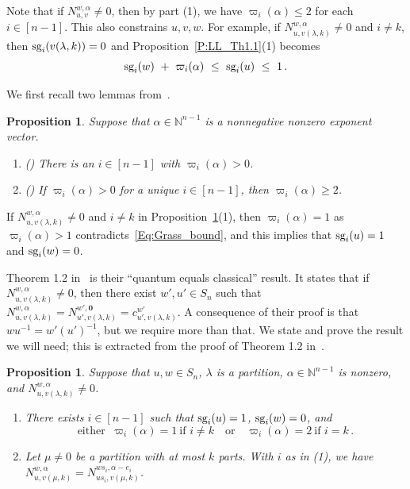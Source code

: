 \documentclass[11pt]{article}
\newtheorem{proposition}[theo]{Proposition}
\theoremstyle{definition}
\numberwithin{equation}{section}
\newcommand{\NN}{{\mathbb N}}
\newcommand{\bzero}{{\mathbf 0}}
\newcommand{\sg}{{\mbox{\rm sg}}}
\begin{document}
Note that if $N^{w,\alpha}_{u,v}\neq 0$, then by part (1), we have $\varpi_i(\alpha)\leq 2$ for each $i\in[n{-}1]$.
This also constrains $u,v,w$.
For example, if $N^{w,\alpha}_{u,v(\lambda,k)}\neq 0$ and $i\neq k$,  then $\sg_i(v(\lambda,k))=0$ and
Proposition~\ref{P:LL_Th1.1}(1) becomes 
\begin{equation}\label{Eq:Grass_bound}
  \sg_i(w)\ +\ \varpi_i(\alpha)\ \leq\ \sg_i(u)\ \leq\ 1\,.
\end{equation}

We first recall two lemmas from~\cite{LeungLi2012}.

\begin{proposition}\label{P:LL_lemmas}
   Suppose that $\alpha\in\NN^{n-1}$ is a nonnegative nonzero  exponent vector.
   \begin{enumerate}
   \item  \emph{(\cite[Lemma 2.8]{LeungLi2012})}
        There is an $i\in[n{-}1]$ with $\varpi_i(\alpha)>0$.
    \item  \emph{(\cite[Lemma 2.10]{LeungLi2012})}
        If $\varpi_i(\alpha)>0$ for a unique $i\in[n{-}1]$, then $\varpi_i(\alpha)\geq 2$.
   \end{enumerate}
\end{proposition}

If $N^{w,\alpha}_{u,v(\lambda,k)}\neq 0$ and $i\neq k$ in Proposition~\ref{P:LL_lemmas}(1), then $\varpi_i(\alpha)=1$ as
$\varpi_i(\alpha)>1$ 
contradicts~\eqref{Eq:Grass_bound}, and this implies that  $\sg_i(u)=1$ and $\sg_i(w)=0$.


Theorem 1.2 in~\cite{LeungLi2012} is their ``quantum equals classical'' result.
It states that if $N^{w, \alpha}_{u,v(\lambda,k)}\neq 0$, then there exist $w',u'\in S_n$ such
that  $N^{w, \alpha}_{u,v(\lambda,k)}=N^{w', {\bzero}}_{u',v(\lambda,k)}= c^{w'}_{u',v(\lambda,k)}$.
A consequence of their proof is that $w u^{-1}=w'(u')^{-1}$, but we require more than that.
We state and prove the result we will need; this is extracted from the proof of Theorem 1.2 in~\cite{LeungLi2012}.

\begin{proposition}\label{P:LLThm1.2}
  Suppose that $u,w\in S_n$, $\lambda$ is a partition, $\alpha\in\NN^{n-1}$ is nonzero, and $N^{w,\alpha}_{u,v(\lambda,k)}\neq 0$.
  \begin{enumerate}
  \item There exists $i\in[n{-}1]$ such that $\sg_i(u)=1$, $\sg_i(w)=0$, and
  \[
    \mbox{either }\ \varpi_i(\alpha) = 1\ \mbox{if }i\neq k
    \quad\mbox{or}\quad
    \varpi_i(\alpha) = 2\ \mbox{if }i= k    \,.
  \]

   \item Let $\mu\neq 0$ be a partition with at most $k$ parts.
          With $i$ as in (1), we have $N^{w,\alpha}_{u,v(\mu,k)}=N^{ws_i, \alpha-e_i}_{us_i,v(\mu,k)}$.
   \end{enumerate}
 \end{proposition}
\end{document}
